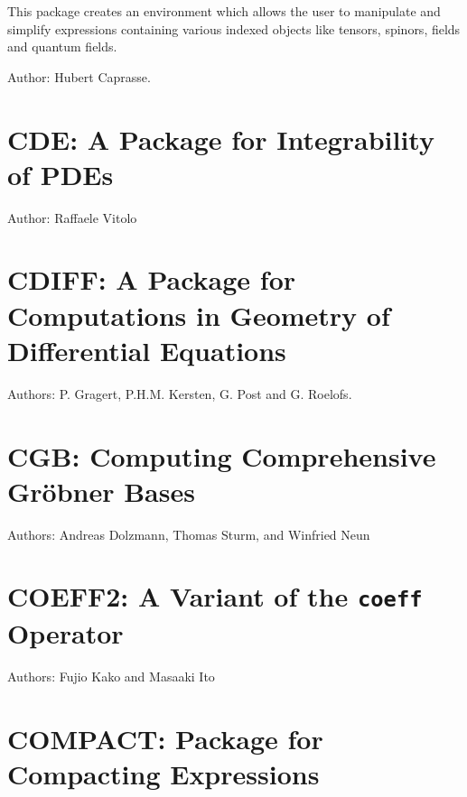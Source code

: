 
This package creates an environment which allows the user to
manipulate and simplify expressions containing various indexed objects
like tensors, spinors, fields and quantum fields.

Author: Hubert Caprasse.



\newpage

\section{CDE: A Package for Integrability of PDEs}

Author: Raffaele Vitolo



\newpage

\section{CDIFF: A Package for Computations in Geometry
  of Differential Equations}
\label{CDIFF}


Authors: P. Gragert, P.H.M. Kersten, G. Post and G. Roelofs.



\newpage

\section{CGB: Computing Comprehensive Gr\"obner Bases}

Authors: Andreas Dolzmann, Thomas Sturm, and Winfried Neun



\newpage

\section{COEFF2: A Variant of the \texttt{coeff} Operator}

Authors: Fujio Kako and Masaaki Ito



\newpage

\iffalse
\section{COMPACT: Package for Compacting Expressions}

